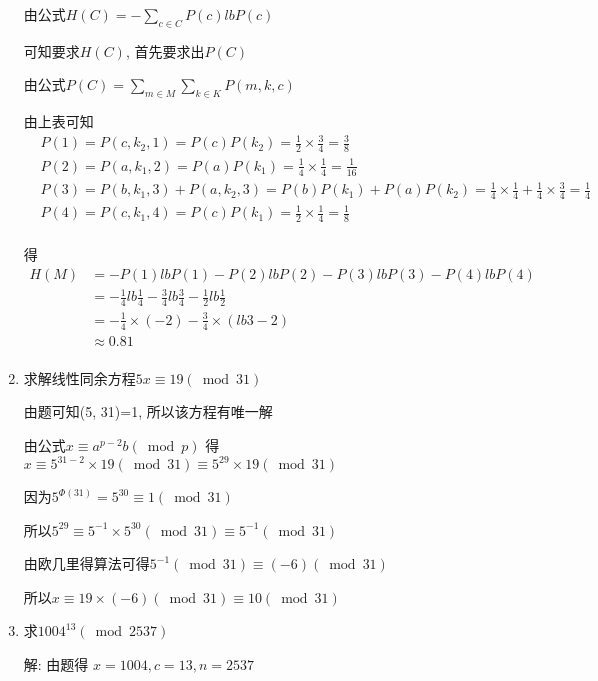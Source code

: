 \documentclass[UTF8]{ctexart}
\begin{document}
\begin{enumerate}
        由公式$H(C)=-\sum\limits_{c\in C}P(c)lbP(c)$

        可知要求$H(C)$, 首先要求出$P(C)$

        由公式$P(C)=\sum\limits_{m\in M}\sum\limits_{k\in K} P(m, k, c)$

        由上表可知
        $$
        \begin{aligned}
          &P(1)=P(c, k_2, 1)=P(c)P(k_2)=\frac{1}{2}\times \frac{3}{4}=\frac{3}{8}\\
          &P(2)=P(a, k_1, 2)=P(a)P(k_1)=\frac{1}{4}\times \frac{1}{4}=\frac{1}{16}\\
          &P(3)=P(b, k_1, 3)+P(a, k_2, 3)=P(b)P(k_1)+P(a)P(k_2)=\frac{1}{4}\times \frac{1}{4}+\frac{1}{4}\times \frac{3}{4}=\frac{1}{4}\\
          &P(4)=P(c, k_1, 4)=P(c)P(k_1)=\frac{1}{2}\times \frac{1}{4}=\frac{1}{8}\\
        \end{aligned}
        $$

        得$$
        \begin{aligned}
          H(M)&=-P(1)lbP(1)-P(2)lbP(2)-P(3)lbP(3)-P(4)lbP(4)\\
              &=-\frac{1}{4}lb\frac{1}{4}-\frac{3}{4}lb\frac{3}{4}-\frac{1}{2}lb\frac{1}{2}\\
              &=-\frac{1}{4}\times (-2)-\frac{3}{4}\times (lb3-2)\\
              &\approx 0.81\\
        \end{aligned}
        $$

        \item 求解线性同余方程$5x\equiv 19(\bmod 31)$

        由题可知(5, 31)=1, 所以该方程有唯一解

        由公式$x\equiv a^{p-2}b(\bmod p)$
        得$x\equiv 5^{31-2}\times 19(\bmod 31)\equiv 5^{29}\times 19(\bmod 31)$

        因为$5^{\Phi(31)}=5^{30}\equiv 1(\bmod 31)$

        所以$5^{29}\equiv 5^{-1}\times 5^{30}(\bmod 31)\equiv 5^{-1}(\bmod 31)$

        由欧几里得算法可得$5^{-1}(\bmod 31)\equiv (-6)(\bmod 31)$

        所以$x\equiv 19\times (-6)(\bmod 31)\equiv 10(\bmod  31)$

        \item 求$1004^{13}(\bmod 2537)$

        解: 由题得 $x=1004, c=13, n=2537$


\end{enumerate}
\end{document}
